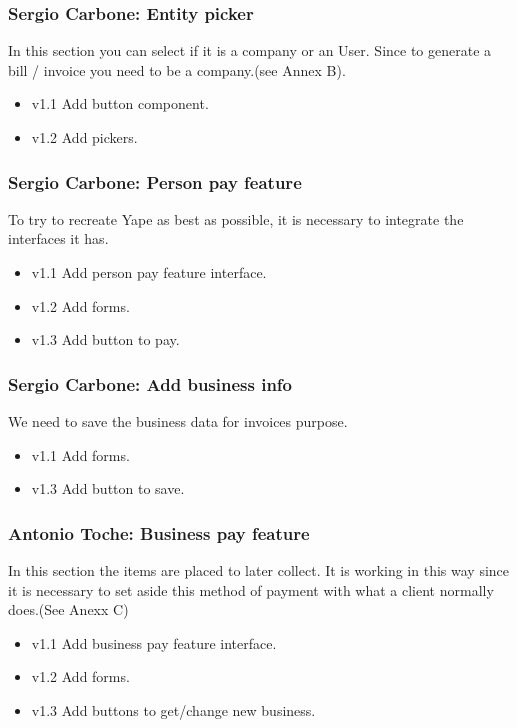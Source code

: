 \documentclass{article}
\begin{document}
\subsubsection{Sergio Carbone: Entity picker}
In this section you can select if it is a company or an User. Since to generate a bill / invoice you need to be a company.(see Annex B).
\begin{itemize}
\item v1.1 Add button component.
\item v1.2 Add pickers.
\end{itemize}

\subsubsection{Sergio Carbone: Person pay feature}
To try to recreate Yape as best as possible, it is necessary to integrate the interfaces it has.
\begin{itemize}
\item v1.1 Add person pay feature interface.
\item v1.2 Add forms.
\item v1.3 Add button to pay.
\end{itemize}

\subsubsection{Sergio Carbone: Add business info}
We need to save the business data for invoices purpose.
\begin{itemize}
\item v1.1 Add forms.
\item v1.3 Add button to save.
\end{itemize}

\subsubsection{Antonio Toche: Business pay feature}
In this section the items are placed to later collect. It is working in this way since it is necessary to set aside this method of payment with what a client normally does.(See Anexx C)
\begin{itemize}
\item v1.1 Add business pay feature interface.
\item v1.2 Add forms.
\item v1.3 Add buttons to get/change new business.
\end{itemize}
\end{document}
